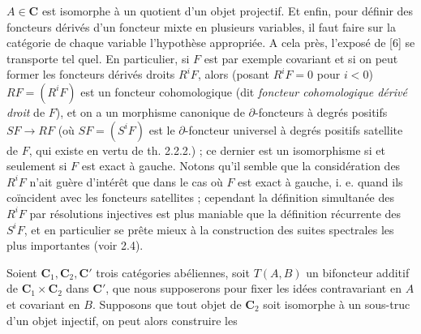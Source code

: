 $A\in \mathbf{C}$ est isomorphe à un quotient d'un objet projectif. Et enfin, pour
définir des foncteurs dérivés d'un foncteur mixte en plusieurs variables, il
faut faire sur la catégorie de chaque variable l'hypothèse appropriée. A cela
près, l'exposé de [6] se transporte tel quel.
En particulier, si $F$ est par exemple covariant et si on peut former les
foncteurs dérivés droits $R^iF$, alors (posant $R^iF=0$ pour $i<0$)
$RF=(R^iF)$ est un foncteur cohomologique (dit \textit{foncteur cohomologique
dérivé droit} de $F$), et on a un morphisme canonique de $\partial$-foncteurs
à degrés positifs $SF\to RF$ (où $SF=(S^iF)$ est le
$\partial$-foncteur universel à degrés positifs satellite de $F$, qui existe
en vertu de th. 2.2.2.) ; ce dernier est un isomorphisme si et seulement si
$F$ est exact à gauche. Notons qu'il semble que la considération des $R^iF$
n'ait guère d'intérêt que dans le cas où $F$ est exact à gauche, i. e. quand ils
coïncident avec les foncteurs satellites ; cependant la définition simultanée
des $R^iF$ par résolutions injectives est plus maniable que la définition
récurrente des $S^iF$, et en particulier se prête mieux à la construction des
suites spectrales les plus importantes (voir 2.4).

Soient $\mathbf{C}_1,\mathbf{C}_2,\mathbf{C}'$ trois catégories abéliennes, soit $T(A,B)$ un bifoncteur
additif de $\mathbf{C}_1\times \mathbf{C}_2$ dans $\mathbf{C}'$, que nous supposerons pour fixer les idées
contravariant en $A$ et covariant en $B$. Supposons que tout objet de $\mathbf{C}_2$
soit isomorphe à un sous-truc d'un objet injectif, on peut alors construire les

